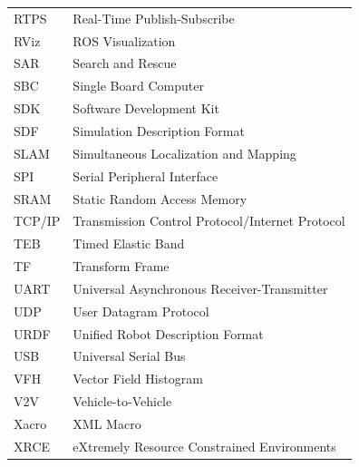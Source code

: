 \begin{longtable}{@{}p{3.5cm} p{10cm}@{}}
RTPS & Real-Time Publish-Subscribe \\
RViz & ROS Visualization \\
SAR & Search and Rescue \\
SBC & Single Board Computer \\
SDK & Software Development Kit \\
SDF & Simulation Description Format \\
SLAM & Simultaneous Localization and Mapping \\
SPI & Serial Peripheral Interface \\
SRAM & Static Random Access Memory \\
TCP/IP & Transmission Control Protocol/Internet Protocol \\
TEB & Timed Elastic Band \\
TF & Transform Frame \\
UART & Universal Asynchronous Receiver-Transmitter \\
UDP & User Datagram Protocol \\
URDF & Unified Robot Description Format \\
USB & Universal Serial Bus \\
VFH & Vector Field Histogram \\
V2V & Vehicle-to-Vehicle \\
Xacro & XML Macro \\
XRCE & eXtremely Resource Constrained Environments \\

\end{longtable}
